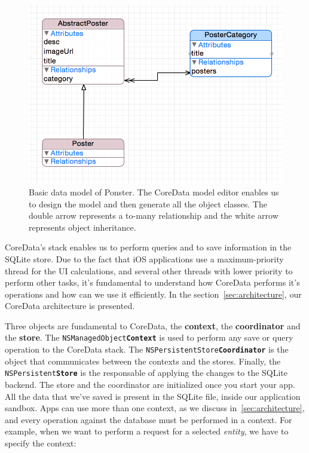 \begin{figure}
\centering
\includegraphics[scale=0.65]{img/coredata.png}
\caption{\label{fig:coredata}Basic data model of Ponster. The CoreData model editor
  enables us to design the model and then generate all the object classes. The
  double arrow represents a to-many relationship and the white arrow represents
  object inheritance.}
\end{figure} 

CoreData's stack enables us to perform queries and to save information in the SQLite
store. Due to the fact that iOS applications use a maximum-priority thread for the
UI calculations, and several other threads with lower priority to perform other
tasks, it's fundamental to understand how CoreData performs it's operations and how
can we use it efficiently. In the section~\ref{sec:architecture}, our CoreData
architecture is presented.

Three objects are fundamental to CoreData, the \textbf{context}, the \textbf{coordinator}
and the \textbf{store}. The \texttt{NSManagedObject\textbf{Context}} is used to perform
any save or query operation to the CoreData stack. The
\texttt{NSPersistentStore\textbf{Coordinator}} is the object that communicates
between the contexts and the stores. Finally, the
\texttt{NSPersistent\textbf{Store}} is the responsable of applying the changes to
the SQLite backend. The store and the coordinator are initialized once you start
your app. All the data that we've saved is present in the SQLite file, inside our
application sandbox. Apps can use more than one context, as we discuss
in~\ref{sec:architecture}, and every operation against the database must be
performed in a context. For example, when we want to perform a request for a
selected \textit{entity}, we have to specify the context:

